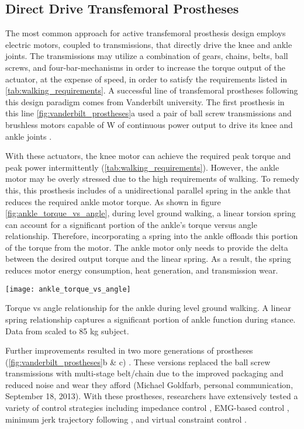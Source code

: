 \subsection{Direct Drive Transfemoral Prostheses}\label{sec:direct_drive}

The most common approach for active transfemoral prosthesis design employs
electric motors, coupled to transmissions, that directly drive the knee and
ankle joints. The transmissions may utilize a combination of gears, chains,
belts, ball screws, and four-bar-mechanisms in order to increase the torque
output of the actuator, at the expense of speed, in order to satisfy the
requirements listed in \cref{tab:walking_requirements}. A successful line of
transfemoral prostheses following this design paradigm comes from Vanderbilt
university. The first prosthesis in this line \cref{fig:vanderbilt_prostheses}a
used a pair of ball screw transmissions and brushless motors capable of
\unit[200]{W} of continuous power output to drive its knee and ankle joints
\citep{sup2009preliminary}. 

With these actuators, the knee motor can achieve the required peak torque and
peak power intermittently (\cref{tab:walking_requirements}). However, the ankle
motor may be overly stressed due to the high requirements of walking. To remedy
this, this prosthesis includes of a unidirectional parallel spring in the ankle
that reduces the required ankle motor torque. As shown in figure
\cref{fig:ankle_torque_vs_angle}, during level ground walking, a linear torsion
spring can account for a significant portion of the ankle's torque versus angle
relationship. Therefore, incorporating a spring into the ankle offloads this
portion of the torque from the motor. The ankle motor only needs to provide the
delta between the desired output torque and the linear spring. As a result, the
spring reduces motor energy consumption, heat generation, and transmission wear.

\begin{marginfigure}
    \centering
    \texttt{[image: ankle\_torque\_vs\_angle]}
    \caption{Torque vs angle relationship for the ankle during level ground
    walking. A linear spring relationship captures a significant portion of
    ankle function during stance. Data from \citet{winter2009biomechanics}
    scaled to 85 kg subject.}
    \label{fig:ankle_torque_vs_angle}
\end{marginfigure}

Further improvements resulted in two more generations of prostheses
(\cref{fig:vanderbilt_prostheses}b \& c) \citep{lawson2013control,
lawson2014robotic}. These versions replaced the ball screw transmissions with
multi-stage belt/chain due to the improved packaging and reduced noise and wear
they afford (Michael Goldfarb, personal communication, September 18, 2013). With
these prostheses, researchers have extensively tested a variety of control
strategies including impedance control \citep{sup2009preliminary,
sup2011upslope, lawson2013control, lawson2014robotic}, EMG-based control
\citep{ha2011volitional, varol2010multiclass}, minimum jerk trajectory following
\citep{lenzi2014minimum}, and virtual constraint control
\citep{gregg2014virtual}. 

